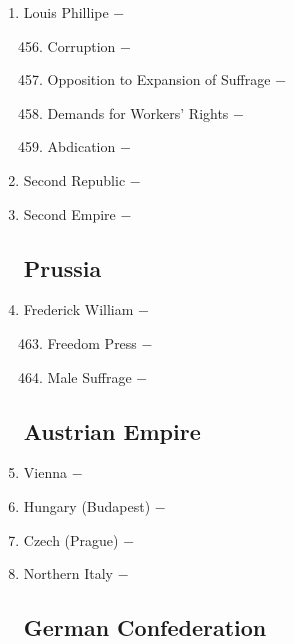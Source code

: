 \documentclass[12pt]{article}
\begin{document}
\begin{enumerate}
\item Louis Phillipe $-$ 

\begin{enumerate}[label=\arabic{*}.]
\setcounter{enumii}{455}

\item Corruption $-$ 

\item Opposition to Expansion of Suffrage $-$ 

\item Demands for Workers' Rights $-$ 

\item Abdication $-$

\end{enumerate}
\setcounter{enumi}{459}

\item Second Republic $-$ 

\item Second Empire $-$ 

\subsection{Prussia}

\item Frederick William $-$ 

\begin{enumerate}[label=\arabic{*}.]
\setcounter{enumii}{462}

\item Freedom Press $-$ 

\item Male Suffrage $-$ 

\end{enumerate}
\setcounter{enumi}{464}

\subsection{Austrian Empire}

\item Vienna $-$ 

\item Hungary (Budapest) $-$ 

\item Czech (Prague) $-$ 

\item Northern Italy $-$ 

\subsection{German Confederation}



\end{enumerate}
\end{document}
